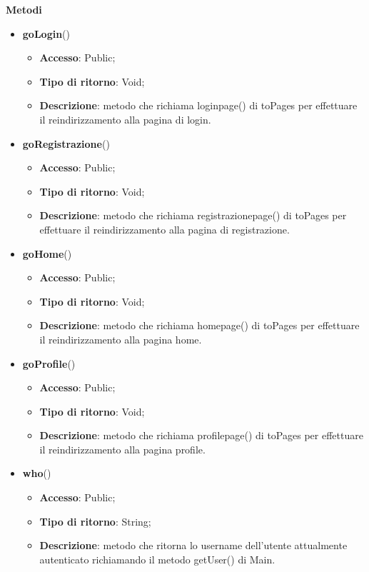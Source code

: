 {		\textbf{Metodi}
		\begin{itemize}
			\item \textbf{goLogin}()
			\begin{itemize}
				\item \textbf{Accesso}: Public;
				\item \textbf{Tipo di ritorno}: Void;
				\item \textbf{Descrizione}: metodo che richiama loginpage() di toPages per effettuare il reindirizzamento alla pagina di login.
			\end{itemize}
			\item \textbf{goRegistrazione}()
			\begin{itemize}
				\item \textbf{Accesso}: Public;
				\item \textbf{Tipo di ritorno}: Void;
				\item \textbf{Descrizione}: metodo che richiama registrazionepage() di toPages per effettuare il reindirizzamento alla pagina di registrazione.
			\end{itemize}
			\item \textbf{goHome}()
			\begin{itemize}
				\item \textbf{Accesso}: Public;
				\item \textbf{Tipo di ritorno}: Void;
				\item \textbf{Descrizione}: metodo che richiama homepage() di toPages per effettuare il reindirizzamento alla pagina home.
			\end{itemize}
			\item \textbf{goProfile}()
			\begin{itemize}
				\item \textbf{Accesso}: Public;
				\item \textbf{Tipo di ritorno}: Void;
				\item \textbf{Descrizione}: metodo che richiama profilepage() di toPages per effettuare il reindirizzamento alla pagina profile.
			\end{itemize}
			\item \textbf{who}()
			\begin{itemize}
				\item \textbf{Accesso}: Public;
				\item \textbf{Tipo di ritorno}: String;
				\item \textbf{Descrizione}: metodo che ritorna lo username dell'utente attualmente autenticato richiamando il metodo getUser() di Main.

\end{itemize}
\end{itemize}}
